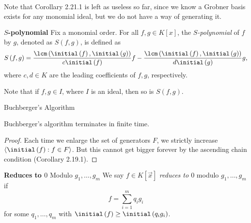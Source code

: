 \documentclass[co439]{subfiles}
\begin{document}
    \np Note that Corollary 2.21.1 is left as useless so far, since we know a Grobner basis exists for any monomial ideal, but we do not have a way of generating it.

    \begin{definition}{\textbf{$S$-polynomial}}
        Fix a monomial order. For all $f,g\in K\left[ x \right]$, the \emph{$S$-polynomial} of $f$ by $g$, denoted as $S\left( f,g \right)$, is defined as
        \begin{equation*}
            S\left( f,g \right) = \frac{\lcm\left( \initial\left( f \right),\initial\left( g \right) \right)}{c\initial\left( f \right)} f - \frac{\lcm\left( \initial\left( f \right),\initial\left( g \right) \right)}{d\initial\left( g \right)}g,
        \end{equation*}
        where $c,d\in K$ are the leading coefficients of $f,g$, respectively.
    \end{definition}
    
    \np Note that if $f,g\in I$, where $I$ is an ideal, then so is $S\left( f,g \right)$.

    \begin{algorithm}{Buchberger's Algorithm}
        \DONE
        \DONE
        \DONE
    \end{algorithm}
    
    \begin{prop}{}
        Buchberger's algorithm terminates in finite time.
    \end{prop}

    \begin{proof}
        Each time we enlarge the set of generators $F$, we strictly increase $\left< \initial\left( f \right):f\in F \right>$. But this cannot get bigger forever by the ascending chain condition (Corollary 2.19.1). 
    \end{proof}
    
    \begin{definition}{\textbf{Reduces to $0$} Modulo $g_1,\ldots,g_m$}
        We say $f\in K\left[ \vec{x} \right]$ \emph{reduces to $0$} modulo $g_1,\ldots,g_m$ if
        \begin{equation*}
            f = \sum^{m}_{i=1} q_ig_i
        \end{equation*}
        for some $q_1,\ldots,q_m$ with $\initial\left( f \right)\geq\initial\left( q_ig_i \right)$.
    \end{definition}
    
\end{document}
